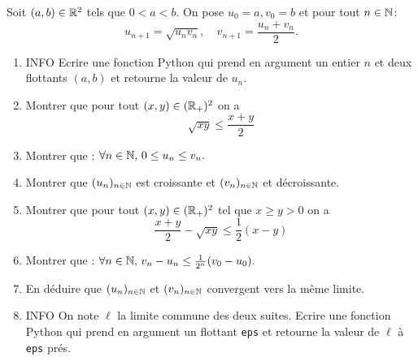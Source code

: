 \documentclass[a4paper, 11pt]{article}
\begin{document}
\begin{exercice}
Soit $(a, b) \in \mathbb{R}^2$ tels que $0<a<b.$ On pose $u_0=a, v_0=b$ et pour tout $n\in \mathbb{N}$:
$$ u_{n+1} =\sqrt{u_n v_n}, \quad v_{n+1} = \frac{u_n +v_n}{2}.$$
\begin{enumerate}
\item INFO Ecrire une fonction Python qui prend en argument un entier $n$ et deux flottants $(a,b)$ et retourne la valeur de $u_n$.
\item Montrer que pour tout $(x,y)\in (\mathbb{R}_+)^2$ on a 
$$\sqrt{xy} \leq \frac{x+y}{2}$$
\item Montrer que :  $\forall n\in \mathbb{N}, \, 0\leq u_n\leq v_n.$
\item Montrer que $(u_n)_{n\in \mathbb{N}}$ est croissante et $(v_n)_{n\in \mathbb{N}}$ et décroissante. 
\item Montrer que pour tout $(x,y)\in (\mathbb{R}_+)^2$ tel que  $x\geq y>0$ on a $$\frac{x+y}{2}-\sqrt{xy}\leq \frac{1}{2}(x-y)$$
\item Montrer que :  $\forall n\in \mathbb{N}, \, v_n-u_n\leq \frac{1}{2^n}(v_0-u_0).$
\item En déduire que $(u_n)_{n\in \mathbb{N}}$ et $(v_n)_{n\in \mathbb{N}}$ convergent vers la même limite.

\item INFO On note $\ell$ la limite commune des deux suites. Ecrire une fonction Python qui prend en argument un flottant \texttt{eps} et retourne la valeur de $\ell$ à \texttt{eps} prés. 

\end{enumerate}
\end{exercice}
\end{document}
